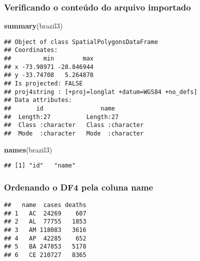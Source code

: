 \documentclass[
]{article}
\newenvironment{Shaded}{\begin{snugshade}}{\end{snugshade}}
\newcommand{\KeywordTok}[1]{\textcolor[rgb]{0.13,0.29,0.53}{\textbf{#1}}}
\newcommand{\NormalTok}[1]{#1}
\newcommand{\OperatorTok}[1]{\textcolor[rgb]{0.81,0.36,0.00}{\textbf{#1}}}
\newcommand{\StringTok}[1]{\textcolor[rgb]{0.31,0.60,0.02}{#1}}
\begin{document}
\hypertarget{verificando-o-conteuxfado-do-arquivo-importado}{%
\subsubsection{Verificando o conteúdo do arquivo
importado}\label{verificando-o-conteuxfado-do-arquivo-importado}}

\begin{Shaded}
\begin{Highlighting}[]
\KeywordTok{summary}\NormalTok{(brazil3)}
\end{Highlighting}
\end{Shaded}

\begin{verbatim}
## Object of class SpatialPolygonsDataFrame
## Coordinates:
##         min        max
## x -73.98971 -28.846944
## y -33.74708   5.264878
## Is projected: FALSE 
## proj4string : [+proj=longlat +datum=WGS84 +no_defs]
## Data attributes:
##       id                name          
##  Length:27          Length:27         
##  Class :character   Class :character  
##  Mode  :character   Mode  :character
\end{verbatim}

\begin{Shaded}
\begin{Highlighting}[]
\KeywordTok{names}\NormalTok{(brazil3)}
\end{Highlighting}
\end{Shaded}

\begin{verbatim}
## [1] "id"   "name"
\end{verbatim}

\hypertarget{ordenando-o-df4-pela-coluna-name}{%
\subsubsection{Ordenando o DF4 pela coluna
name}\label{ordenando-o-df4-pela-coluna-name}}

\begin{Shaded}
\end{Shaded}

\begin{verbatim}
##   name  cases deaths
## 1   AC  24269    607
## 2   AL  77755   1853
## 3   AM 118083   3616
## 4   AP  42285    652
## 5   BA 247853   5178
## 6   CE 210727   8365
\end{verbatim}
\end{document}
